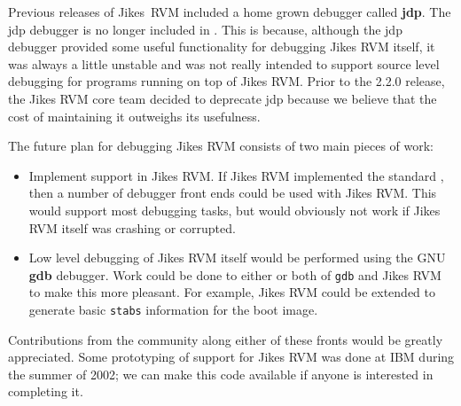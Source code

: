 Previous releases of Jikes\TMweb\ RVM included a home grown
debugger called {\bf jdp}.  The jdp debugger is no longer included in
\jrvm{}.  This is because, although the jdp debugger provided some
useful functionality for debugging Jikes RVM itself, it was always a
little unstable and was not really intended to support source level
debugging for programs running on top of Jikes RVM.  Prior to the
2.2.0 release, the Jikes RVM core team decided to deprecate jdp
because we believe that the cost of maintaining it outweighs its
usefulness.


The future plan for debugging Jikes RVM consists of two main pieces of
work:

\label{JDWP}
\begin{itemize}
\item Implement  support in Jikes RVM. If Jikes RVM
implemented the standard , then a 
number of debugger front ends could be used with Jikes RVM.  This
would support most debugging tasks, but would obviously not work if
Jikes RVM itself was crashing or corrupted.

\item Low level debugging of Jikes RVM itself would be performed using
the GNU {\bf gdb} debugger.  Work could be done to either or both of
{\tt gdb} and Jikes RVM to make this more pleasant.  For example,
Jikes RVM could be extended to generate basic {\tt stabs} information
for the boot image.
\end{itemize}

Contributions from the community along either of these fronts would be
greatly appreciated.  Some prototyping of  support for Jikes RVM
was done at IBM during the summer of 2002; we can make this code
available if anyone is interested in completing it.


